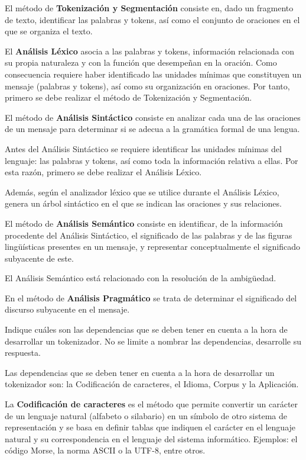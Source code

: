 \documentclass[11pt]{exam}
\begin{document}
\begin{questions}
El método de {\bf Tokenización y Segmentación} consiste en, dado un fragmento de texto, identificar las palabras y tokens, así como el conjunto de oraciones en el que se organiza el texto.

El {\bf Análisis Léxico} asocia a las palabras y tokens, información relacionada con su propia naturaleza y con la función que desempeñan en la oración. Como consecuencia requiere haber identificado las unidades mínimas que constituyen un mensaje (palabras y tokens), así como su organización en oraciones. Por tanto, primero se debe realizar el método de Tokenización y Segmentación.

El método de {\bf Análisis Sintáctico} consiste en analizar cada una de las oraciones de un mensaje para determinar si se adecua a la gramática formal de una lengua. 

Antes del Análisis Sintáctico se requiere identificar las unidades mínimas del lenguaje: las palabras y tokens, así como toda la información relativa a ellas. Por esta razón, primero se debe realizar el Análisis Léxico.

Además, según el analizador léxico que se utilice durante el Análisis Léxico, genera un árbol sintáctico en el que se indican las oraciones y sus relaciones.

El método de {\bf Análisis Semántico} consiste en identificar, de la información procedente del Análisis Sintáctico, el significado de las palabras y de las figuras lingüísticas presentes en un mensaje, y representar conceptualmente el significado subyacente de este.

El Análisis Semántico está relacionado con la resolución de la ambigüedad.

En el método de {\bf Análisis Pragmático} se trata de determinar el significado del discurso subyacente en el mensaje.

\question Indique cuáles son las dependencias que se deben tener en cuenta a la hora de desarrollar un tokenizador. No se limite a nombrar las dependencias, desarrolle su respuesta.

Las dependencias que se deben tener en cuenta a la hora de desarrollar un tokenizador son: la Codificación de caracteres, el Idioma, Corpus y la Aplicación.

La {\bf Codificación de caracteres} es el método que permite convertir un carácter de un lenguaje natural (alfabeto o silabario) en un símbolo de otro sistema de representación y se basa en definir tablas que indiquen el carácter en el lenguaje natural y su correspondencia en el lenguaje del sistema informático. Ejemplos: el código Morse, la norma ASCII o la UTF-8, entre otros. 


\end{questions}
\end{document}
